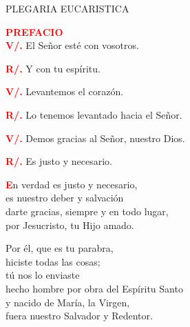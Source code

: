 \documentclass[12pt, letterpaper]{report}
\begin{document}
\begin{center}
\Large PLEGARIA EUCARISTICA
\end{center}

\Large {\bfseries \textcolor{red}{PREFACIO}} \newline \\

\Large \hspace{-0.9cm} {\bfseries \textcolor{red}{V/.}} \hspace{0.5cm} El Se\~nor est\'e con vosotros. \newline

\Large \hspace{-0.9cm} {\bfseries \textcolor{red}{R/.}} \hspace{0.5cm} Y con tu esp\'iritu. \newline

\Large \hspace{-0.9cm} {\bfseries \textcolor{red}{V/.}} \hspace{0.5cm} Levantemos el coraz\'on. \newline

\Large \hspace{-0.9cm} {\bfseries \textcolor{red}{R/.}} \hspace{0.5cm} Lo tenemos levantado hacia el Se\~nor. \newline

\Large \hspace{-0.9cm} {\bfseries \textcolor{red}{V/.}} \hspace{0.5cm} Demos gracias al Se\~nor, nuestro Dios. \newline

\Large \hspace{-0.9cm} {\bfseries \textcolor{red}{R/.}} \hspace{0.5cm} Es justo y necesario.

\lettrine[lines=1]{\bfseries \textcolor{red}{E}}{}\Large n verdad es justo y necesario, \\
es nuestro deber y salvaci\'on \\
darte gracias, siempre y en todo lugar, \\
por Jesucristo, tu Hijo amado. \newline

Por \'el, que es tu parabra, \\
hiciste todas las cosas; \\
t\'u nos lo enviaste \\
hecho hombre por obra del Esp\'iritu Santo \\
y nacido de Mar\'ia, la Virgen, \\
fuera nuestro Salvador y Redentor. \newline
\end{document}
